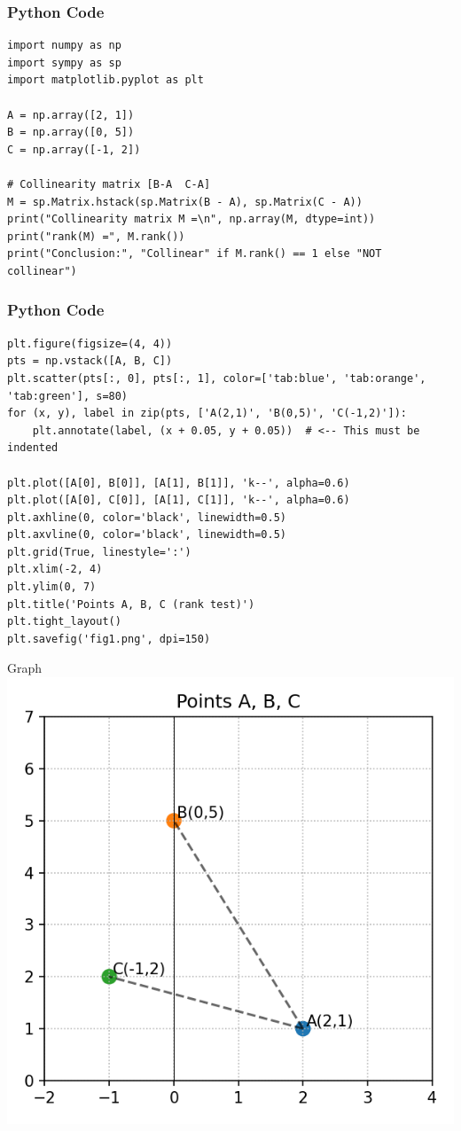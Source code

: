 \documentclass{beamer}
\begin{document}
\begin{frame}[fragile]
    \frametitle{Python Code}
    \begin{lstlisting}
import numpy as np
import sympy as sp
import matplotlib.pyplot as plt

A = np.array([2, 1])
B = np.array([0, 5])
C = np.array([-1, 2])

# Collinearity matrix [B-A  C-A]
M = sp.Matrix.hstack(sp.Matrix(B - A), sp.Matrix(C - A))
print("Collinearity matrix M =\n", np.array(M, dtype=int))
print("rank(M) =", M.rank())
print("Conclusion:", "Collinear" if M.rank() == 1 else "NOT collinear")
\end{lstlisting}
\end{frame}

\begin{frame}[fragile]
    \frametitle{Python Code}
    \begin{lstlisting}
plt.figure(figsize=(4, 4))
pts = np.vstack([A, B, C])
plt.scatter(pts[:, 0], pts[:, 1], color=['tab:blue', 'tab:orange', 'tab:green'], s=80)
for (x, y), label in zip(pts, ['A(2,1)', 'B(0,5)', 'C(-1,2)']):
    plt.annotate(label, (x + 0.05, y + 0.05))  # <-- This must be indented

plt.plot([A[0], B[0]], [A[1], B[1]], 'k--', alpha=0.6)
plt.plot([A[0], C[0]], [A[1], C[1]], 'k--', alpha=0.6)
plt.axhline(0, color='black', linewidth=0.5)
plt.axvline(0, color='black', linewidth=0.5)
plt.grid(True, linestyle=':')
plt.xlim(-2, 4)
plt.ylim(0, 7)
plt.title('Points A, B, C (rank test)')
plt.tight_layout()
plt.savefig('fig1.png', dpi=150)
    \end{lstlisting}
\end{frame}


\begin{frame}{Graph}
   \centering
    \includegraphics[width=\columnwidth, height=0.8\textheight, keepaspectratio]{figs/fig1.png}
    \label{fig:Beamer/figs/fig1.png}
\end{frame}
\end{document}
